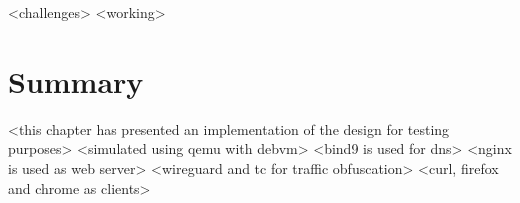 <challenges>
<working>











\section{Summary}

<this chapter has presented an implementation of the design for testing purposes>
<simulated using qemu with debvm>
<bind9 is used for dns>
<nginx is used as web server>
<wireguard and tc for traffic obfuscation>
<curl, firefox and chrome as clients>
